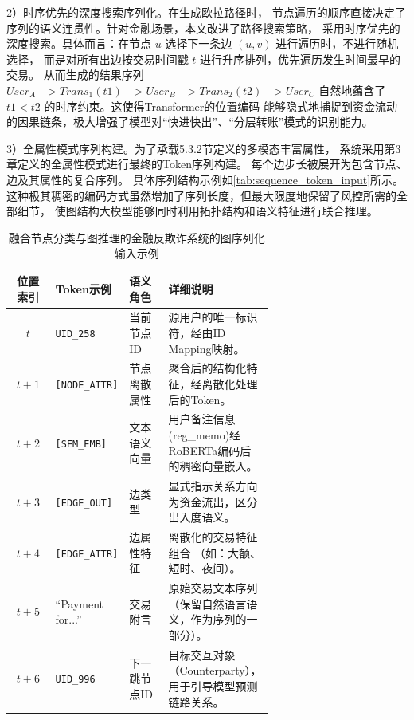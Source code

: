 {2）时序优先的深度搜索序列化。}在生成欧拉路径时，
节点遍历的顺序直接决定了序列的语义连贯性。针对金融场景，本文改进了路径搜索策略，
采用{时序优先的深度搜索}。具体而言：在节点 $u$ 选择下一条边 $(u, v)$ 进行遍历时，不进行随机选择，
    而是对所有出边按交易时间戳 $t$ 进行升序排列，优先遍历发生时间最早的交易。
    从而生成的结果序列 $ User_A -> Trans_1(t1) -> User_B -> Trans_2(t2) -> User_C $
    自然地蕴含了 $t1 < t2$ 的时序约束。这使得Transformer的位置编码
    能够隐式地捕捉到资金流动的因果链条，极大增强了模型对“快进快出”、“分层转账”模式的识别能力。

    {3）全属性模式序列构建。}为了承载5.3.2节定义的多模态丰富属性，
系统采用第3章定义的全属性模式进行最终的Token序列构建。
每个边步长被展开为包含节点、边及其属性的复合序列。
具体序列结构示例如\autoref{tab:sequence_token_input}所示。
这种极其稠密的编码方式虽然增加了序列长度，但最大限度地保留了风控所需的全部细节，
使图结构大模型能够同时利用拓扑结构和语义特征进行联合推理。


\begin{table}[h]
\centering
\small 
\caption{融合节点分类与图推理的金融反欺诈系统的图序列化输入示例}
\label{tab:sequence_token_input}
\renewcommand{\arraystretch}{1}
\begin{tabular}{c p{0.15\linewidth} p{0.15\linewidth} p{0.35\linewidth}}
\toprule
\textbf{位置索引} & \textbf{Token示例} & \textbf{语义角色} & \textbf{详细说明} \\
\midrule
$t$ & \texttt{UID\_258} & 当前节点ID & 源用户的唯一标识符，经由ID Mapping映射。 \\
\midrule
$t+1$ & \texttt{[NODE\_ATTR]} & 节点离散属性 & 聚合后的结构化特征，经离散化处理后的Token。 \\
\midrule
$t+2$ & \texttt{[SEM\_EMB]} & 文本语义向量 & 
用户备注信息({reg\_memo})经RoBERTa编码后的稠密向量嵌入。 \\
\midrule
$t+3$ & \texttt{[EDGE\_OUT]} & 边类型 & 显式指示关系方向为资金流出，区分出入度语义。 \\
\midrule
$t+4$ & \texttt{[EDGE\_ATTR]} & 边属性特征 & 离散化的交易特征组合
（如：{大额}、{短时}、{夜间}）。 \\
\midrule
$t+5$ & ``Payment for...'' & 交易附言 & 原始交易文本序列（保留自然语言语义，作为序列的一部分）。 \\
\midrule
$t+6$ & \texttt{UID\_996} & 下一跳节点ID & 目标交互对象（Counterparty），用于引导模型预测链路关系。 \\
\bottomrule
\end{tabular}
\end{table}




